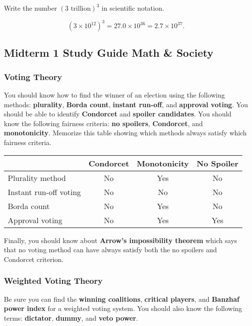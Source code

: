 \documentclass[11pt,answers]{exam}
\begin{document}
\begin{questions}
\question Write the number $(3 \text{ trillion})^3$ in scientific notation.
\begin{solution}
$$(3 \times 10^{12})^3 = 27.0 \times 10^{36} = 2.7 \times 10^{37}.$$
\end{solution}
\vfill
\end{questions}

\newpage
\subsection*{Midterm 1 Study Guide \hfill Math \& Society}

\subsubsection*{Voting Theory}

You should know how to find the winner of an election using the following methods: \textbf{plurality}, \textbf{Borda count}, \textbf{instant run-off}, and \textbf{approval voting}.  You should be able to identify \textbf{Condorcet} and \textbf{spoiler candidates}.  You should know the following fairness criteria: \textbf{no spoilers}, \textbf{Condorcet}, and \textbf{monotonicity}. Memorize this table showing which methods always satisfy which fairness criteria.

\begin{center}
\begin{tabular}{l|ccc} 
~ & Condorcet & Monotonicity & No Spoiler  \\ \hline
Plurality method & No & Yes & No \\
Instant run-off voting & No & No & No \\
Borda count & No & Yes & No \\
Approval voting & No & Yes & Yes \\ 
\end{tabular}
\end{center}

Finally, you should know about \textbf{Arrow's impossibility theorem} which says that no voting method can have always satisfy both the no spoilers and Condorcet criterion.  

\subsubsection*{Weighted Voting Theory}

Be sure you can find the \textbf{winning coalitions}, \textbf{critical players}, and \textbf{Banzhaf power index} for a weighted voting system.  You should also know the following terms: \textbf{dictator}, \textbf{dummy}, and \textbf{veto power}. 
\end{document}
